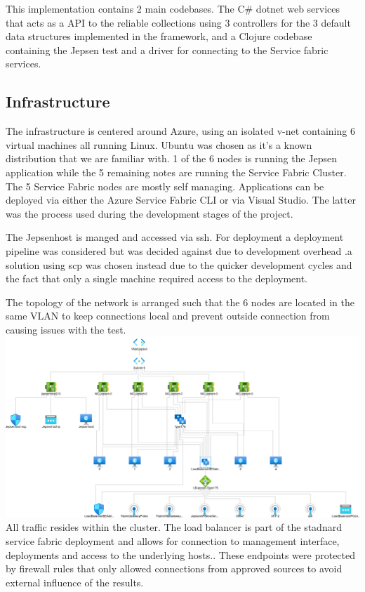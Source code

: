 \documentclass[a4paper,10pt,titlepage]{report}
\begin{document}
    This implementation contains 2 main codebases. The C\# dotnet web services that acts as a API to the reliable collections using 3 controllers for the 3 default data structures implemented in the framework, and a Clojure codebase containing the Jepsen test and a driver for connecting to the Service fabric services.

    \subsection{Infrastructure}
    The infrastructure is centered around Azure, using an isolated v-net containing 6 virtual machines all running Linux. Ubuntu was chosen as it's a known distribution that we are familiar with. 1 of the 6 nodes is running the Jepsen application while the 5 remaining notes are running the Service Fabric Cluster.
    The 5 Service Fabric nodes are mostly self managing. Applications can be deployed via either the Azure Service Fabric CLI\cite{servicefabriccli} or via Visual Studio\cite{servicefabricguide}. The latter was the process used during the development stages of the project.

    The Jepsenhost is manged and accessed via ssh. For deployment a deployment pipeline was considered but was decided against due to development overhead .a solution using scp was chosen instead due to the quicker development cycles and the fact that only a single machine required access to the deployment. 
    

    The topology of the network is arranged such that the 6 nodes are located in the same VLAN to keep connections local and prevent outside connection from causing issues with the test.\\
    \includegraphics[scale=0.3]{images/topology.png}
    \\

    All traffic resides within the cluster. The load balancer is part of the stadnard service fabric deployment and allows for connection to management interface, deployments and access to the underlying hosts.. These endpoints were protected by firewall rules that only allowed connections from approved sources to avoid external influence of the results.
\end{document}
